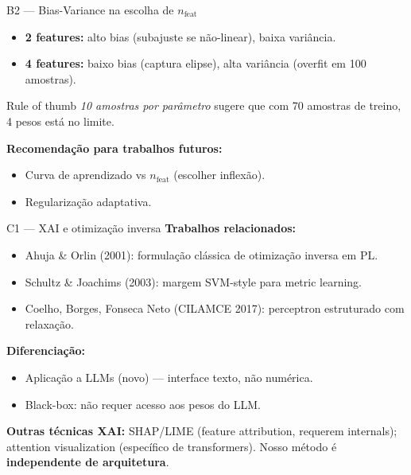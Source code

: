 \documentclass[aspectratio=169,10pt]{beamer}
\begin{document}
\begin{frame}{B2 --- Bias-Variance na escolha de $n_{\text{feat}}$}
  \footnotesize
  \begin{itemize}
    \item \textbf{2 features:} alto bias (subajuste se n\~ao-linear), baixa vari\^ancia.
    \item \textbf{4 features:} baixo bias (captura elipse), alta vari\^ancia (overfit em 100 amostras).
  \end{itemize}
  \medskip
  Rule of thumb \emph{10 amostras por par\^ametro} sugere que com 70 amostras de treino, 4 pesos est\'a no limite.
  \medskip

  \textbf{Recomenda\c{c}\~ao para trabalhos futuros:}
  \begin{itemize}
    \item Curva de aprendizado vs $n_{\text{feat}}$ (escolher inflex\~ao).
    \item Regulariza\c{c}\~ao adaptativa.
  \end{itemize}
\end{frame}

\begin{frame}{C1 --- XAI e otimiza\c{c}\~ao inversa}
  \footnotesize
  \textbf{Trabalhos relacionados:}
  \begin{itemize}
    \item Ahuja \& Orlin (2001): formula\c{c}\~ao cl\'assica de otimiza\c{c}\~ao inversa em PL.
    \item Schultz \& Joachims (2003): margem SVM-style para metric learning.
    \item Coelho, Borges, Fonseca Neto (CILAMCE 2017): perceptron estruturado com relaxa\c{c}\~ao.
  \end{itemize}
  \medskip
  \textbf{Diferencia\c{c}\~ao:}
  \begin{itemize}
    \item Aplica\c{c}\~ao a LLMs (novo) --- interface texto, n\~ao num\'erica.
    \item Black-box: n\~ao requer acesso aos pesos do LLM.
  \end{itemize}
  \medskip
  \textbf{Outras t\'ecnicas XAI:} SHAP/LIME (feature attribution, requerem internals); attention visualization (espec\'ifico de transformers). Nosso m\'etodo \'e \textbf{independente de arquitetura}.
\end{frame}
\end{document}
